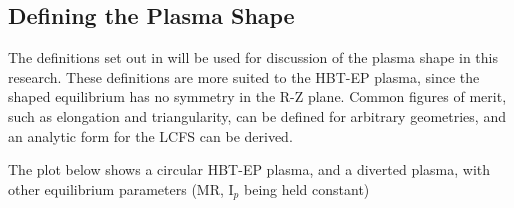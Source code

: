 \subsection{Defining the Plasma Shape}
The definitions set out in \cite{Luce} will be used for discussion of the plasma shape in this research.  These definitions are more suited to the HBT-EP plasma, since the shaped equilibrium has no symmetry in the R-Z plane.  Common figures of merit, such as elongation and triangularity, can be defined for arbitrary geometries, and an analytic form for the LCFS can be derived.

The plot below shows a circular HBT-EP plasma, and a diverted plasma, with other equilibrium parameters (MR, I$_p$ being held constant) 